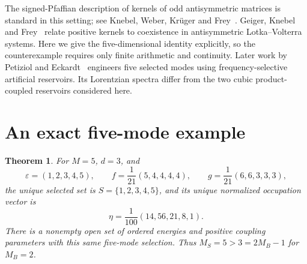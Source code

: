 \documentclass[11pt]{article}
\newtheorem{theorem}{Theorem}
\begin{document}
The signed-Pfaffian description of kernels of odd antisymmetric
matrices is standard in this setting; see
Knebel, Weber, Kr\"uger and Frey~\cite[Methods, Eq.\ (19)]{knebel}.
Geiger, Knebel and Frey~\cite[Sec.\ 2.2]{geiger} relate positive
kernels to coexistence in antisymmetric Lotka--Volterra systems.
Here we give the five-dimensional identity explicitly, so the
counterexample requires only finite arithmetic and continuity.
Later work by Petiziol and Eckardt~\cite[Eq.\ (6), Fig.\ 3]{petiziol}
engineers five selected modes using frequency-selective artificial
reservoirs. Its Lorentzian spectra differ from the two cubic
product-coupled reservoirs considered here.

\section{An exact five-mode example}
\begin{theorem}\label{thm:example}
For $M=5$, $d=3$, and
\begin{equation}\label{eq:parameters}
 \varepsilon=(1,2,3,4,5),\qquad
 f=\frac1{21}(5,4,4,4,4),\qquad
 g=\frac1{21}(6,6,3,3,3),
\end{equation}
the unique selected set is $S=\{1,2,3,4,5\}$, and its unique
normalized occupation vector is
\begin{equation}\label{eq:occupation}
 \eta=\frac1{100}(14,56,21,8,1).
\end{equation}
There is a nonempty open set of ordered energies and positive
coupling parameters with this same five-mode selection.
Thus $M_S=5>3=2M_B-1$ for $M_B=2$.
\end{theorem}
\end{document}

